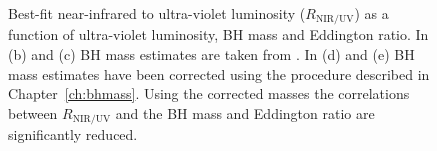 \begin{figure}
\captionsetup[subfigure]{labelformat=empty}  
  \centering
  \subfloat[\label{fig:correlations_contour_a}]{}
  \subfloat[\label{fig:correlations_contour_b}]{}
  \subfloat[\label{fig:correlations_contour_c}]{}
  \subfloat[\label{fig:correlations_contour_d}]{}
  \subfloat[\label{fig:correlations_contour_e}]{}
  \caption[{Best-fit near-infrared to ultra-violet luminosity ($R_{\text{NIR/UV}}$) as a function of ultra-violet luminosity, BH mass and Eddington ratio.}]{Best-fit near-infrared to ultra-violet luminosity ($R_{\text{NIR/UV}}$) as a function of ultra-violet luminosity, BH mass and Eddington ratio. In (b) and (c) BH mass estimates are taken from \citet{shen11}. In (d) and (e) BH mass estimates have been corrected using the procedure described in Chapter~\ref{ch:bhmass}. Using the corrected masses the correlations between $R_{\text{NIR/UV}}$ and the BH mass and Eddington ratio are significantly reduced.}
  \label{fig:correlations_contour}
\end{figure}

